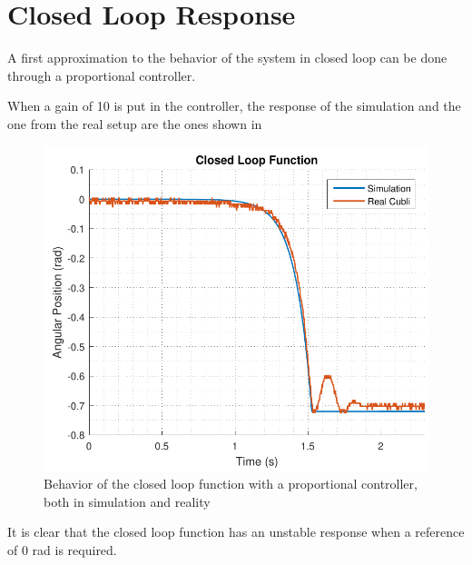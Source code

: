 \section{Closed Loop Response}\label{closedLoop}
A first approximation to the behavior of the system in closed loop can be done through a proportional controller.

When a gain of 10 is put in the controller, the response of the simulation and the one from the real setup are the ones shown in 

\begin{figure}[H] 
	\centering 
	\includegraphics[scale=0.6]{figures/closedLoopResponse}	
	\caption{Behavior of the closed loop function with a proportional controller, both in simulation and reality}
	\label{closedLoopResponse}
\end{figure}
%
It is clear that the closed loop function has an unstable response when a reference of 0 rad is required.
